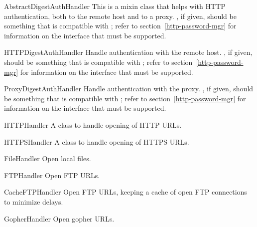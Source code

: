 \begin{classdesc}{AbstractDigestAuthHandler}{}
This is a mixin class that helps with HTTP authentication, both
to the remote host and to a proxy.
, if given, should be something that is compatible
with ; refer to section~\ref{http-password-mgr}
for information on the interface that must be supported.
\end{classdesc}

\begin{classdesc}{HTTPDigestAuthHandler}{}
Handle authentication with the remote host.
, if given, should be something that is compatible
with ; refer to section~\ref{http-password-mgr}
for information on the interface that must be supported.
\end{classdesc}

\begin{classdesc}{ProxyDigestAuthHandler}{}
Handle authentication with the proxy.
, if given, should be something that is compatible
with ; refer to section~\ref{http-password-mgr}
for information on the interface that must be supported.
\end{classdesc}

\begin{classdesc}{HTTPHandler}{}
A class to handle opening of HTTP URLs.
\end{classdesc}

\begin{classdesc}{HTTPSHandler}{}
A class to handle opening of HTTPS URLs.
\end{classdesc}

\begin{classdesc}{FileHandler}{}
Open local files.
\end{classdesc}

\begin{classdesc}{FTPHandler}{}
Open FTP URLs.
\end{classdesc}

\begin{classdesc}{CacheFTPHandler}{}
Open FTP URLs, keeping a cache of open FTP connections to minimize
delays.
\end{classdesc}

\begin{classdesc}{GopherHandler}{}
Open gopher URLs.
\end{classdesc}

